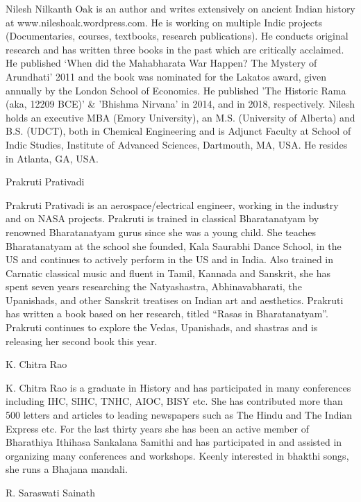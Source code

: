 Nilesh Nilkanth Oak is an author and writes extensively on ancient Indian history at www.nileshoak.wordpress.com. He is working on multiple Indic projects (Documentaries, courses, textbooks, research publications). He conducts original research and has written three books in the past which are critically acclaimed. He published ‘When did the Mahabharata War Happen? The Mystery of Arundhati’ 2011 and the book was nominated for the Lakatos award, given annually by the London School of Economics. He published 'The Historic Rama (aka, 12209 BCE)' \& 'Bhishma Nirvana' in 2014, and in 2018, respectively. Nilesh holds an executive MBA (Emory University), an M.S. (University of Alberta) and B.S. (UDCT), both in Chemical Engineering and is Adjunct Faculty at School of Indic Studies, Institute of Advanced Sciences, Dartmouth, MA, USA. He resides in Atlanta, GA, USA.

Prakruti Prativadi

Prakruti Prativadi is an aerospace/electrical engineer, working in the industry and on NASA projects. Prakruti is trained in classical Bharatanatyam by renowned Bharatanatyam gurus since she was a young child. She teaches Bharatanatyam at the school she founded, Kala Saurabhi Dance School, in the US and continues to actively perform in the US and in India. Also trained in Carnatic classical music and fluent in Tamil, Kannada and Sanskrit, she has spent seven years researching the Natyashastra, Abhinavabharati, the Upanishads, and other Sanskrit treatises on Indian art and aesthetics. Prakruti has written a book based on her research, titled “Rasas in Bharatanatyam”. Prakruti continues to explore the Vedas, Upanishads, and shastras and is releasing her second book this year.

K. Chitra Rao

K. Chitra Rao is a graduate in History and has participated in many conferences including IHC, SIHC, TNHC, AIOC, BISY etc. She has contributed more than 500 letters and articles to leading newspapers such as The Hindu and The Indian Express etc. For the last thirty years she has been an active member of Bharathiya Ithihasa Sankalana Samithi and has participated in and assisted in organizing many conferences and workshops. Keenly interested in bhakthi songs, she runs a Bhajana mandali.

R. Saraswati Sainath

